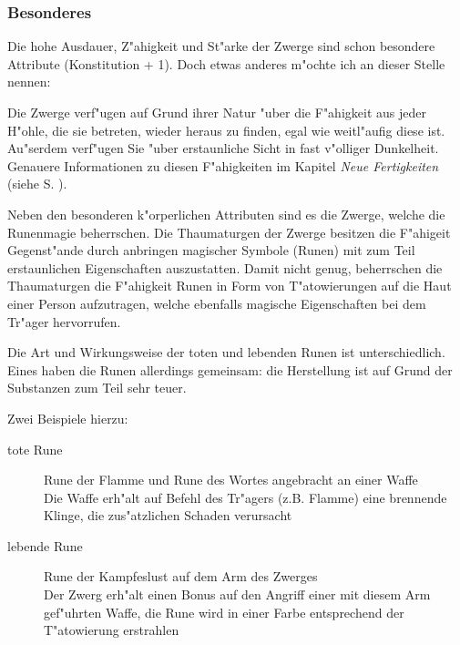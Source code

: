 \subsubsection{Besonderes}
\par Die hohe Ausdauer, Z"ahigkeit und St"arke der Zwerge sind schon besondere Attribute (Konstitution + 1). Doch etwas anderes m"ochte ich an dieser Stelle nennen:
\par Die Zwerge verf"ugen auf Grund ihrer Natur "uber die F"ahigkeit aus jeder H"ohle, die sie betreten, wieder heraus zu finden, egal wie weitl"aufig diese ist. Au"serdem verf"ugen Sie "uber erstaunliche Sicht in fast v"olliger Dunkelheit. Genauere Informationen zu diesen F"ahigkeiten im Kapitel \textit{Neue Fertigkeiten} (siehe S. \pageref{neuefertigkeiten}).
\par Neben den besonderen k"orperlichen Attributen sind es die Zwerge, welche die Runenmagie beherrschen. Die Thaumaturgen der Zwerge besitzen die F"ahigeit Gegenst"ande durch anbringen magischer Symbole (Runen) mit zum Teil erstaunlichen Eigenschaften auszustatten. Damit nicht genug, beherrschen die Thaumaturgen die F"ahigkeit Runen in Form von T"atowierungen auf die Haut einer Person aufzutragen, welche ebenfalls magische Eigenschaften bei dem Tr"ager hervorrufen.
\par Die Art und Wirkungsweise der toten und lebenden Runen ist
unterschiedlich. Eines haben die Runen allerdings
gemeinsam: die Herstellung ist auf Grund der Substanzen zum Teil
sehr teuer.
\par Zwei Beispiele hierzu:
\begin{description}
\item [tote Rune] Rune der Flamme und Rune des Wortes angebracht an einer Waffe\\
Die Waffe erh"alt auf Befehl des Tr"agers (z.B. Flamme) eine brennende Klinge, die zus"atzlichen Schaden verursacht
\item [lebende Rune] Rune der Kampfeslust auf dem Arm des Zwerges\\
Der Zwerg erh"alt einen Bonus auf den Angriff einer mit diesem Arm gef"uhrten Waffe, die Rune wird in einer Farbe entsprechend der T"atowierung erstrahlen
\end{description}
